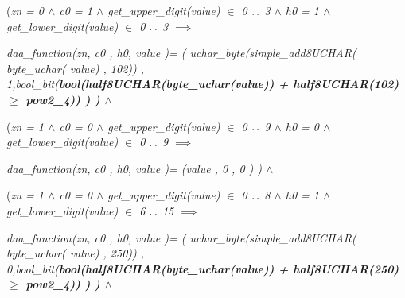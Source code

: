 \documentclass[11pt]{article}
\begin{document}
\begin{sloppypar}
\hspace*{0.60in}\rm (\hspace*{0.10in}\it zn \rm = \rm 0  $\land$  \it c0 \rm = \rm 1  $\land$  \it get\_upper\_digit\rm (\it value\rm )  $\in$  \rm 0 $\mathbin{\ldotp\ldotp}$ \rm 3  $\land$  \it h0 \rm = \rm 1  $\land$  \it get\_lower\_digit\rm (\it value\rm )  $\in$  \rm 0 $\mathbin{\ldotp\ldotp}$ \rm 3  $\implies$ 

\hspace*{0.80in}\it daa\_function\rm (\it zn\rm , \it c0 \rm , \it h0\hspace*{0.10in}\rm , \it value \rm )\rm = \rm ( \it uchar\_byte\rm (\it simple\_add8UCHAR\rm ( \it byte\_uchar\rm ( \it value\rm ) \rm , \rm 1\rm 0\rm 2\rm )\rm ) \rm , \rm 1\rm ,\hspace*{0.10in}\it bool\_bit\rm (\bf bool\rm (\hspace*{0.15in}\it half8UCHAR\rm (\it byte\_uchar\rm (\it value\rm )\rm ) \rm + \it half8UCHAR\rm (\rm 1\rm 0\rm 2\rm )  $\geq$  \it pow2\_4\rm )\rm ) \rm ) \rm ) $\land$ 

\hspace*{0.60in}

\hspace*{0.60in}\rm (\hspace*{0.10in}\it zn \rm = \rm 1  $\land$  \it c0 \rm = \rm 0  $\land$  \it get\_upper\_digit\rm (\it value\rm )  $\in$  \rm 0 $\mathbin{\ldotp\ldotp}$ \rm 9  $\land$  \it h0 \rm = \rm 0  $\land$  \it get\_lower\_digit\rm (\it value\rm )  $\in$  \rm 0 $\mathbin{\ldotp\ldotp}$ \rm 9  $\implies$ 

\hspace*{0.80in}\it daa\_function\rm (\it zn\rm , \it c0 \rm , \it h0\hspace*{0.10in}\rm , \it value \rm )\rm = \rm (\hspace*{0.10in}\it value \rm , \rm 0 \rm , \rm 0 \rm ) \rm )  $\land$ 

\hspace*{0.60in}\rm (\hspace*{0.10in}\it zn \rm = \rm 1  $\land$  \it c0 \rm = \rm 0  $\land$  \it get\_upper\_digit\rm (\it value\rm )  $\in$  \rm 0 $\mathbin{\ldotp\ldotp}$ \rm 8  $\land$  \it h0 \rm = \rm 1  $\land$  \it get\_lower\_digit\rm (\it value\rm )  $\in$  \rm 6 $\mathbin{\ldotp\ldotp}$ \rm 1\rm 5  $\implies$ 

\hspace*{0.80in}\it daa\_function\rm (\it zn\rm , \it c0 \rm , \it h0\hspace*{0.10in}\rm , \it value \rm )\rm = \rm ( \it uchar\_byte\rm (\it simple\_add8UCHAR\rm ( \it byte\_uchar\rm ( \it value\rm ) \rm , \rm 2\rm 5\rm 0\rm )\rm ) \rm , \rm 0\rm ,\hspace*{0.10in}\it bool\_bit\rm (\bf bool\rm (\hspace*{0.15in}\it half8UCHAR\rm (\it byte\_uchar\rm (\it value\rm )\rm ) \rm + \it half8UCHAR\rm (\rm 2\rm 5\rm 0\rm )  $\geq$  \it pow2\_4\rm )\rm ) \rm ) \rm ) $\land$ 


\end{sloppypar}
\end{document}
